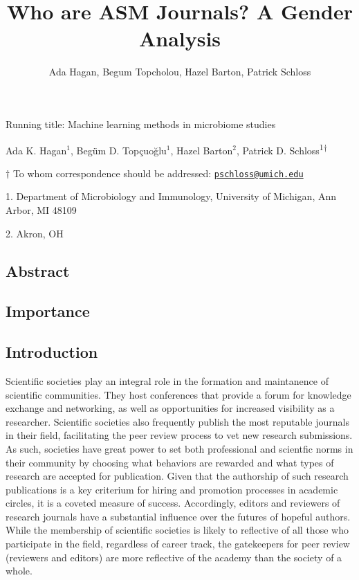 \documentclass[11pt,]{article}
\title{Who are ASM Journals? A Gender Analysis}
\author{Ada Hagan, Begum Topcholou, Hazel Barton, Patrick Schloss}
\date{}
\begin{document}
\maketitle

\vspace{35mm}

Running title: Machine learning methods in microbiome studies

\vspace{35mm}

Ada K. Hagan\({^1}\), Begüm D. Topçuoğlu\({^1}\), Hazel Barton\({^2}\),
Patrick D. Schloss\textsuperscript{1\(\dagger\)}

\vspace{40mm}

\(\dagger\) To whom correspondence should be addressed:
\href{mailto:pschloss@umich.edu}{\nolinkurl{pschloss@umich.edu}}

1. Department of Microbiology and Immunology, University of Michigan,
Ann Arbor, MI 48109

2. Akron, OH

\newpage

\linenumbers

\subsection{Abstract}\label{abstract}

\subsection{Importance}\label{importance}

\subsection{Introduction}\label{introduction}

Scientific societies play an integral role in the formation and
maintanence of scientific communities. They host conferences that
provide a forum for knowledge exchange and networking, as well as
opportunities for increased visibility as a researcher. Scientific
societies also frequently publish the most reputable journals in their
field, facilitating the peer review process to vet new research
submissions. As such, societies have great power to set both
professional and scientfic norms in their community by choosing what
behaviors are rewarded and what types of research are accepted for
publication. Given that the authorship of such research publications is
a key criterium for hiring and promotion processes in academic circles,
it is a coveted measure of success. Accordingly, editors and reviewers
of research journals have a substantial influence over the futures of
hopeful authors. While the membership of scientific societies is likely
to reflective of all those who participate in the field, regardless of
career track, the gatekeepers for peer review (reviewers and editors)
are more reflective of the academy than the society of a whole.
\end{document}
